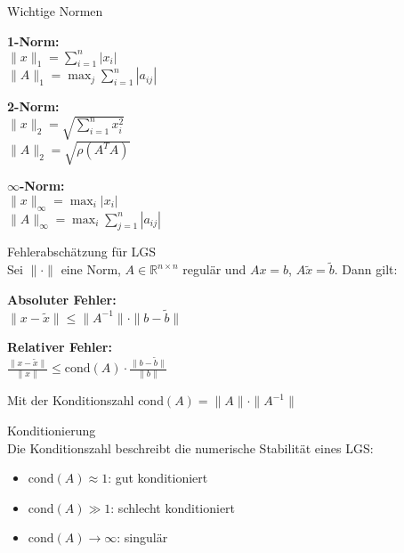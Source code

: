 \begin{concept}{Wichtige Normen}\\
\begin{minipage}[t]{0.3\textwidth}
    \textbf{1-Norm:}\\
    $\|x\|_1 = \sum_{i=1}^n |x_i|$\\
    $\|A\|_1 = \max_j \sum_{i=1}^n |a_{ij}|$
\end{minipage}
\hspace{2mm}
\begin{minipage}[t]{0.3\textwidth}
    \textbf{2-Norm:}\\
    $\|x\|_2 = \sqrt{\sum_{i=1}^n x_i^2}$\\
    $\|A\|_2 = \sqrt{\rho(A^TA)}$
\end{minipage}
\hspace{2mm}
\begin{minipage}[t]{0.3\textwidth}
    $\infty$\textbf{-Norm:}\\
    $\|x\|_\infty = \max_i |x_i|$\\
    $\|A\|_\infty = \max_i \sum_{j=1}^n |a_{ij}|$
\end{minipage}
\end{concept}

\begin{theorem}{Fehlerabschätzung für LGS}\\
Sei $\|\cdot\|$ eine Norm, $A \in \mathbb{R}^{n\times n}$ regulär und $Ax = b$, $A\tilde{x} = \tilde{b}$. Dann gilt:
\vspace{1mm}\\
\begin{minipage}[t]{0.47\textwidth}
    \textbf{Absoluter Fehler:}\\
    $\|x - \tilde{x}\| \leq \|A^{-1}\| \cdot \|b - \tilde{b}\|$
\end{minipage}
\hspace{2mm}
\begin{minipage}[t]{0.47\textwidth}
    \textbf{Relativer Fehler:}\\
    $\frac{\|x - \tilde{x}\|}{\|x\|} \leq \text{cond}(A) \cdot \frac{\|b - \tilde{b}\|}{\|b\|}$
\end{minipage}

Mit der Konditionszahl $\text{cond}(A) = \|A\| \cdot \|A^{-1}\|$
\end{theorem}

\begin{concept}{Konditionierung}\\
Die Konditionszahl beschreibt die numerische Stabilität eines LGS:
\begin{itemize}
    \item $\text{cond}(A) \approx 1$: gut konditioniert
    \item $\text{cond}(A) \gg 1$: schlecht konditioniert
    \item $\text{cond}(A) \to \infty$: singulär
\end{itemize}
\end{concept}


